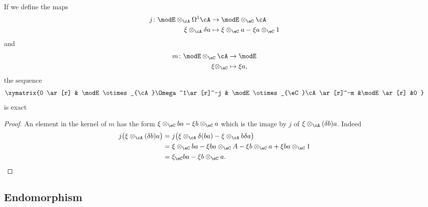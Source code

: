 \begin{proposition}
	If we define the maps
	\begin{equation}
		\begin{aligned}
			j\colon \modE\otimes_{\cA}\Omega^1\cA & \to \modE\otimes_{\eC}\cA                     \\
			\xi\otimes_{\cA}\delta a              & \mapsto \xi\otimes_{\eC}a-\xi a\otimes_{\eC}1
		\end{aligned}
	\end{equation}
	and
	\begin{equation}
		\begin{aligned}
			m\colon \modE\otimes_{\eC}\cA & \to \modE      \\
			\xi\otimes_{\eC}              & \mapsto \xi a,
		\end{aligned}
	\end{equation}
	the sequence
	\[
		\xymatrix{%
			0 \ar[r]		&	\modE\otimes_{\cA}\Omega^1\ar[r]^-j	&  \modE\otimes_{\eC}\cA\ar[r]^-m	&\modE\ar[r]	&0
		}
	\]
	is exact
\end{proposition}

\begin{proof}
	An element in the kernel of $m$ has the form $\xi\otimes_{\eC}ba-\xi b\otimes_{\eC}a$ which is the image by $j$ of $\xi\otimes_{\cA}(\delta b)a$. Indeed
	\begin{align*}
		j\big( \xi\otimes_{\cA}(\delta b)a \big) & =j\big( \xi\otimes_{\cA}\delta(ba)-\xi\otimes_{\cA}b\delta a \big)                \\
		                                         & =\xi\otimes_{\eC}ba-\xi ba\otimes_{\eC}A-\xi b\otimes_{\eC}a+\xi ba\otimes_{\eC}1 \\
		                                         & =\xi_{\eC}ba-\xi b\otimes_{\eC} a.
	\end{align*}
\end{proof}

\subsection{Endomorphism}


